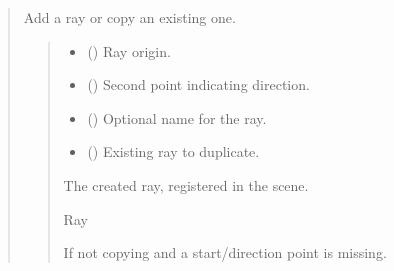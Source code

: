 \documentclass[letterpaper,10pt,english]{sphinxmanual}
\begin{document}
\begin{quote}
\begin{fulllineitems}
\begin{fulllineitems}
\label{\detokenize{pygeox:pygeox.add_objects.AddNamespace.ray}}
\pysigstartsignatures
\pysiglinewithargsret
{}
{\sphinxparamcomma {}\sphinxparamcomma {}\sphinxparamcomma {}}
{}
\pysigstopsignatures
\sphinxAtStartPar
Add a ray or copy an existing one.
\begin{quote}\begin{description}
\begin{itemize}
\item {} 
\sphinxAtStartPar
{} (\sphinxstyleliteralemphasis{\sphinxupquote{ | }}) \textendash{} Ray origin.

\item {} 
\sphinxAtStartPar
{} (\sphinxstyleliteralemphasis{\sphinxupquote{ | }}) \textendash{} Second point indicating direction.

\item {} 
\sphinxAtStartPar
{} (\sphinxstyleliteralemphasis{\sphinxupquote{ | }}) \textendash{} Optional name for the ray.

\item {} 
\sphinxAtStartPar
{} (\sphinxstyleliteralemphasis{\sphinxupquote{ | }}) \textendash{} Existing ray to duplicate.

\end{itemize}

\sphinxAtStartPar
The created ray, registered in the scene.

\sphinxAtStartPar
Ray

\sphinxAtStartPar
{} \textendash{} If not copying and a start/direction point is missing.


\end{description}
\end{quote}
\end{fulllineitems}
\end{fulllineitems}
\end{quote}
\end{document}
